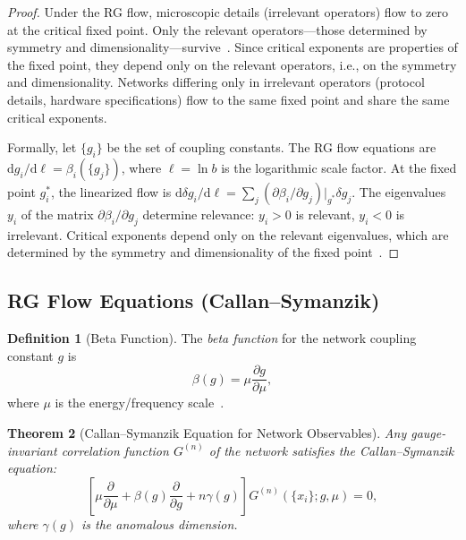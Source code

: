 \documentclass[11pt,twocolumn,a4paper]{article}
\newtheorem{theorem}{Theorem}[section]
\theoremstyle{definition}
\newtheorem{definition}[theorem]{Definition}
\newcommand{\dif}{\mathrm{d}}
\begin{document}
\begin{proof}
Under the RG flow, microscopic details (irrelevant operators) flow to zero at the
critical fixed point. Only the relevant operators---those determined by symmetry and
dimensionality---survive~\cite{wilson1971}. Since critical exponents are properties of
the fixed point, they depend only on the relevant operators, i.e., on the symmetry
and dimensionality. Networks differing only in irrelevant operators (protocol details,
hardware specifications) flow to the same fixed point and share the same critical
exponents.

Formally, let $\{g_i\}$ be the set of coupling constants. The RG flow equations are
$\dif g_i / \dif \ell = \beta_i(\{g_j\})$, where $\ell = \ln b$ is the logarithmic
scale factor. At the fixed point $g_i^*$, the linearized flow is $\dif \delta g_i /
\dif \ell = \sum_j (\partial \beta_i / \partial g_j)|_{g^*} \delta g_j$. The eigenvalues
$y_i$ of the matrix $\partial \beta_i / \partial g_j$ determine relevance: $y_i > 0$
is relevant, $y_i < 0$ is irrelevant. Critical exponents depend only on the relevant
eigenvalues, which are determined by the symmetry and dimensionality of the fixed
point~\cite{wilson1971,kadanoff1966}.
\end{proof}

\subsection{RG Flow Equations (Callan--Symanzik)}\label{sec:rg:callan}

\begin{definition}[Beta Function]\label{def:beta}
The \emph{beta function} for the network coupling constant $g$ is
\begin{equation}\label{eq:beta_function}
  \beta(g) = \mu \frac{\partial g}{\partial \mu},
\end{equation}
where $\mu$ is the energy/frequency scale~\cite{wilson1971}.
\end{definition}

\begin{theorem}[Callan--Symanzik Equation for Network Observables]\label{thm:callan_symanzik}
Any gauge-invariant correlation function $G^{(n)}$ of the network satisfies the
Callan--Symanzik equation:
\begin{equation}\label{eq:callan_symanzik}
  \left[\mu\frac{\partial}{\partial\mu} + \beta(g)\frac{\partial}{\partial g}
  + n\gamma(g)\right] G^{(n)}(\{x_i\}; g, \mu) = 0,
\end{equation}
where $\gamma(g)$ is the anomalous dimension.
\end{theorem}
\end{document}
